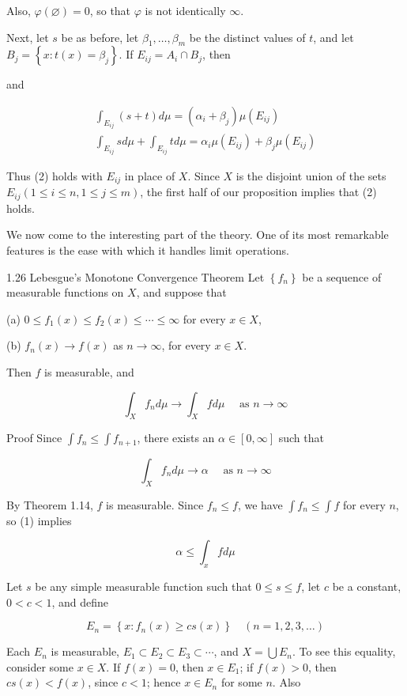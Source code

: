 \documentclass[10pt]{article}
\begin{document}
Also, $\varphi(\varnothing)=0$, so that $\varphi$ is not identically $\infty$.

Next, let $s$ be as before, let $\beta_{1}, \ldots, \beta_{m}$ be the distinct values of $t$, and let $B_{j}=\left\{x: t(x)=\beta_{j}\right\}$. If $E_{i j}=A_{i} \cap B_{j}$, then

and

$$
\begin{gathered}
\int_{E_{i j}}(s+t) d \mu=\left(\alpha_{i}+\beta_{j}\right) \mu\left(E_{i j}\right) \\
\int_{E_{i j}} s d \mu+\int_{E_{i j}} t d \mu=\alpha_{i} \mu\left(E_{i j}\right)+\beta_{j} \mu\left(E_{i j}\right)
\end{gathered}
$$

Thus (2) holds with $E_{i j}$ in place of $X$. Since $X$ is the disjoint union of the sets $E_{i j}(1 \leq i \leq n, 1 \leq j \leq m)$, the first half of our proposition implies that (2) holds.

We now come to the interesting part of the theory. One of its most remarkable features is the ease with which it handles limit operations.

1.26 Lebesgue's Monotone Convergence Theorem Let $\left\{f_{n}\right\}$ be a sequence of measurable functions on $X$, and suppose that

(a) $0 \leq f_{1}(x) \leq f_{2}(x) \leq \cdots \leq \infty$ for every $x \in X$,

(b) $f_{n}(x) \rightarrow f(x)$ as $n \rightarrow \infty$, for every $x \in X$.

Then $f$ is measurable, and

$$
\int_{X} f_{n} d \mu \rightarrow \int_{X} f d \mu \quad \text { as } n \rightarrow \infty
$$

Proof Since $\int f_{n} \leq \int f_{n+1}$, there exists an $\alpha \in[0, \infty]$ such that

$$
\int_{X} f_{n} d \mu \rightarrow \alpha \quad \text { as } n \rightarrow \infty
$$

By Theorem 1.14, $f$ is measurable. Since $f_{n} \leq f$, we have $\int f_{n} \leq \int f$ for every $n$, so (1) implies

$$
\alpha \leq \int_{x} f d \mu
$$

Let $s$ be any simple measurable function such that $0 \leq s \leq f$, let $c$ be a constant, $0<c<1$, and define

$$
E_{n}=\left\{x: f_{n}(x) \geq c s(x)\right\} \quad(n=1,2,3, \ldots)
$$

Each $E_{n}$ is measurable, $E_{1} \subset E_{2} \subset E_{3} \subset \cdots$, and $X=\bigcup E_{n}$. To see this equality, consider some $x \in X$. If $f(x)=0$, then $x \in E_{1}$; if $f(x)>0$, then $c s(x)<f(x)$, since $c<1$; hence $x \in E_{n}$ for some $n$. Also
\end{document}
